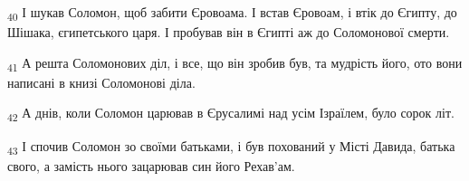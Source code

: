 \begin{tcolorbox}
\textsubscript{40} І шукав Соломон, щоб забити Єровоама. І встав Єровоам, і втік до Єгипту, до Шішака, єгипетського царя. І пробував він в Єгипті аж до Соломонової смерти.
\end{tcolorbox}
\begin{tcolorbox}
\textsubscript{41} А решта Соломонових діл, і все, що він зробив був, та мудрість його, ото вони написані в книзі Соломонові діла.
\end{tcolorbox}
\begin{tcolorbox}
\textsubscript{42} А днів, коли Соломон царював в Єрусалимі над усім Ізраїлем, було сорок літ.
\end{tcolorbox}
\begin{tcolorbox}
\textsubscript{43} І спочив Соломон зо своїми батьками, і був похований у Місті Давида, батька свого, а замість нього зацарював син його Рехав'ам.
\end{tcolorbox}

